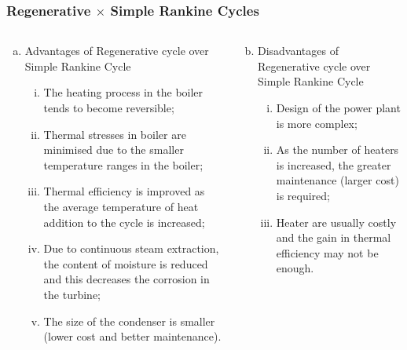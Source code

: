 \documentclass[10pt,compress]{beamer}
\begin{document}
\begin{frame}
 \frametitle{Regenerative $\times$ Simple Rankine Cycles}
  \begin{columns}
   \begin{column}[c]{0.5\linewidth}
    \begin{enumerate}[(a)]
     \item<1-> Advantages of Regenerative cycle over Simple Rankine Cycle
     \begin{enumerate} [(i)]%
      \item<1-> The heating process in the boiler tends to become reversible;
      \item<1-> Thermal stresses in boiler are minimised due to the smaller temperature ranges in the boiler;
      \item<1-> Thermal efficiency is improved as the average temperature of heat addition to the cycle is increased;
      \item<1-> Due to continuous steam extraction, the content of moisture is reduced and this decreases the corrosion in the turbine;
      \item<1-> The size of the condenser is smaller (lower cost and better maintenance).
     \end{enumerate}
    \end{enumerate} 
   \end{column}
%
   \begin{column}[c]{0.5\linewidth}  
    \begin{enumerate}[(a)]\setcounter{enumi}{1}
     \item<2-> Disadvantages of Regenerative cycle over Simple Rankine Cycle
     \begin{enumerate}[(i)] %
      \item<2-> Design of the power plant is more complex;
      \item<2-> As the number of heaters is increased, the greater maintenance (larger cost) is required;
      \item<2-> Heater are usually costly and the gain in thermal efficiency may not be enough. 
     \end{enumerate}
    \end{enumerate} 
   \end{column}
  \end{columns}
  
\end{frame}
 
\end{document}
